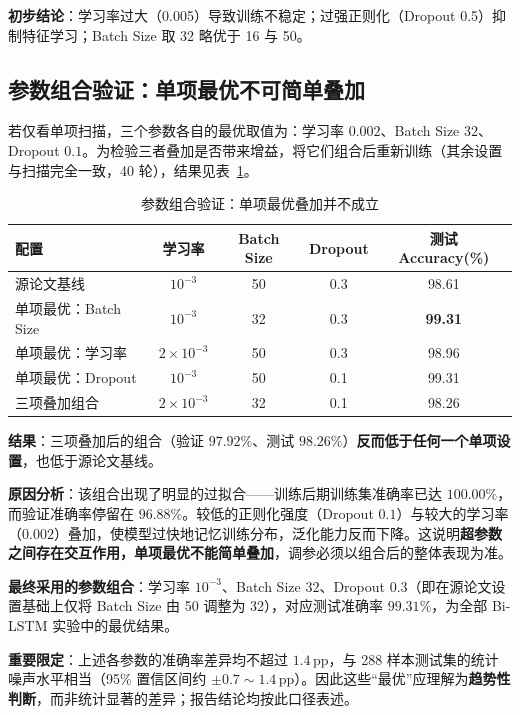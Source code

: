 \documentclass[11pt,a4paper]{ctexart}
\begin{document}
\textbf{初步结论}：学习率过大（0.005）导致训练不稳定；过强正则化（Dropout 0.5）抑制特征学习；Batch Size 取 32 略优于 16 与 50。

\subsection{参数组合验证：单项最优不可简单叠加}

若仅看单项扫描，三个参数各自的最优取值为：学习率 $0.002$、Batch Size $32$、Dropout $0.1$。为检验三者叠加是否带来增益，将它们组合后重新训练（其余设置与扫描完全一致，40 轮），结果见表~\ref{tab:combo}。

\begin{table}[htbp]\centering
\caption{参数组合验证：单项最优叠加并不成立}
\label{tab:combo}
\begin{tabular}{lcccc}
\toprule
配置 & 学习率 & Batch Size & Dropout & 测试 Accuracy(\%) \\
\midrule
源论文基线 & $10^{-3}$ & 50 & 0.3 & 98.61 \\
单项最优：Batch Size & $10^{-3}$ & 32 & 0.3 & \textbf{99.31} \\
单项最优：学习率 & $2\times10^{-3}$ & 50 & 0.3 & 98.96 \\
单项最优：Dropout & $10^{-3}$ & 50 & 0.1 & 99.31 \\
三项叠加组合 & $2\times10^{-3}$ & 32 & 0.1 & 98.26 \\
\bottomrule
\end{tabular}
\end{table}

\textbf{结果}：三项叠加后的组合（验证 $97.92\%$、测试 $98.26\%$）\textbf{反而低于任何一个单项设置}，也低于源论文基线。

\textbf{原因分析}：该组合出现了明显的过拟合——训练后期训练集准确率已达 $100.00\%$，而验证准确率停留在 $96.88\%$。较低的正则化强度（Dropout $0.1$）与较大的学习率（$0.002$）叠加，使模型过快地记忆训练分布，泛化能力反而下降。这说明\textbf{超参数之间存在交互作用，单项最优不能简单叠加}，调参必须以组合后的整体表现为准。

\textbf{最终采用的参数组合}：学习率 $10^{-3}$、Batch Size $32$、Dropout $0.3$（即在源论文设置基础上仅将 Batch Size 由 50 调整为 32），对应测试准确率 $99.31\%$，为全部 Bi-LSTM 实验中的最优结果。

\vspace{2pt}
\noindent\textbf{重要限定}：上述各参数的准确率差异均不超过 $1.4$\,pp，与 288 样本测试集的统计噪声水平相当（95\% 置信区间约 $\pm0.7\sim1.4$\,pp）。因此这些“最优”应理解为\textbf{趋势性判断}，而非统计显著的差异；报告结论均按此口径表述。
\end{document}
